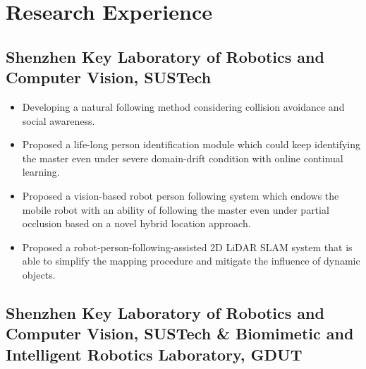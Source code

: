 \documentclass[12pt,a4paper,sans]{moderncv} %
\begin{document}

\section{Research Experience}
\subsection{Shenzhen Key Laboratory of Robotics and Computer Vision, SUSTech}
{
  \begin{itemize}
    \item Developing a natural following method considering collision avoidance and social awareness.
    \item Proposed a life-long person identification module which could keep identifying the master even under severe domain-drift condition with online continual learning.
    \item Proposed a vision-based robot person following system which endows the mobile robot with an ability of following the master even under partial occlusion based on a novel hybrid location approach.
    \item Proposed a robot-person-following-assisted 2D LiDAR SLAM system that is able to simplify the mapping procedure and mitigate the influence of dynamic objects.
  \end{itemize}
}

\subsection{Shenzhen Key Laboratory of Robotics and Computer Vision, SUSTech \&  Biomimetic and Intelligent Robotics Laboratory, GDUT}
\end{document}

